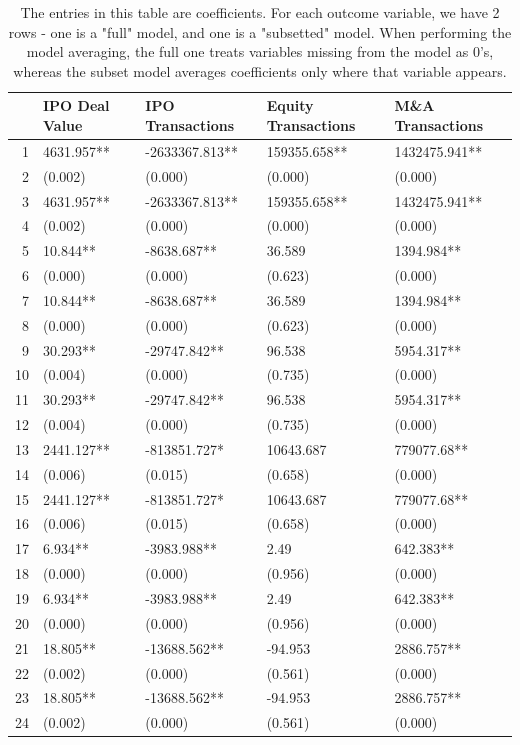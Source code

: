 \documentclass{article}
\begin{document}
\begin{table}[H]
\centering
\begin{tabular}{rllll}
  \hline
 & IPO Deal Value & IPO Transactions & Equity Transactions & M\&A Transactions \\
  \hline
1 & 4631.957** & -2633367.813** & 159355.658** & 1432475.941** \\
  2 & (0.002) & (0.000) & (0.000) & (0.000) \\
  3 & 4631.957** & -2633367.813** & 159355.658** & 1432475.941** \\
  4 & (0.002) & (0.000) & (0.000) & (0.000) \\
  5 & 10.844** & -8638.687** & 36.589 & 1394.984** \\
  6 & (0.000) & (0.000) & (0.623) & (0.000) \\
  7 & 10.844** & -8638.687** & 36.589 & 1394.984** \\
  8 & (0.000) & (0.000) & (0.623) & (0.000) \\
  9 & 30.293** & -29747.842** & 96.538 & 5954.317** \\
  10 & (0.004) & (0.000) & (0.735) & (0.000) \\
  11 & 30.293** & -29747.842** & 96.538 & 5954.317** \\
  12 & (0.004) & (0.000) & (0.735) & (0.000) \\
  13 & 2441.127** & -813851.727* & 10643.687 & 779077.68** \\
  14 & (0.006) & (0.015) & (0.658) & (0.000) \\
  15 & 2441.127** & -813851.727* & 10643.687 & 779077.68** \\
  16 & (0.006) & (0.015) & (0.658) & (0.000) \\
  17 & 6.934** & -3983.988** & 2.49 & 642.383** \\
  18 & (0.000) & (0.000) & (0.956) & (0.000) \\
  19 & 6.934** & -3983.988** & 2.49 & 642.383** \\
  20 & (0.000) & (0.000) & (0.956) & (0.000) \\
  21 & 18.805** & -13688.562** & -94.953 & 2886.757** \\
  22 & (0.002) & (0.000) & (0.561) & (0.000) \\
  23 & 18.805** & -13688.562** & -94.953 & 2886.757** \\
  24 & (0.002) & (0.000) & (0.561) & (0.000) \\
   \hline
\end{tabular}
\caption{The entries in this table are coefficients. For each outcome variable,
                  we have 2 rows - one is a "full" model, and one is a "subsetted" model.
                  When performing the model averaging, the full one treats variables missing from the model as 0's,
                  whereas the subset model averages coefficients only where that variable appears.}
\end{table}
\end{document}
